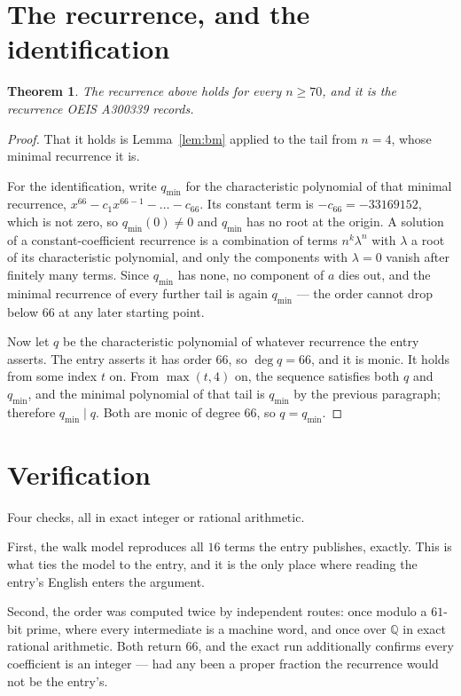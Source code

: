 \documentclass[11pt,a4paper]{article}
\theoremstyle{plain}
\newtheorem{theorem}{Theorem}
\theoremstyle{definition}
\begin{document}
\section{The recurrence, and the identification}

\begin{theorem}
The recurrence above holds for every $n\ge70$, and it is the recurrence OEIS A300339 records.
\end{theorem}

\begin{proof}
That it holds is Lemma~\ref{lem:bm} applied to the tail from $n=4$, whose minimal
recurrence it is.

For the identification, write $q_{\min}$ for the characteristic polynomial of that minimal
recurrence, $x^{66}-c_1x^{66-1}-\dots-c_{66}$. Its constant term is
$-c_{66}=-33169152$, which is not zero, so $q_{\min}(0)\neq0$ and $q_{\min}$ has no
root at the origin. A solution of a constant-coefficient recurrence is a combination of terms
$n^{k}\lambda^{n}$ with $\lambda$ a root of its characteristic polynomial, and only the
components with $\lambda=0$ vanish after finitely many terms. Since $q_{\min}$ has none, no
component of $a$ dies out, and the minimal recurrence of every further tail is again
$q_{\min}$ --- the order cannot drop below $66$ at any later starting point.

Now let $q$ be the characteristic polynomial of whatever recurrence the entry asserts. The
entry asserts it has order $66$, so $\deg q=66$, and it is monic. It holds from some
index $t$ on. From $\max(t,4)$ on, the sequence satisfies both $q$ and $q_{\min}$, and
the minimal polynomial of that tail is $q_{\min}$ by the previous paragraph; therefore
$q_{\min}\mid q$. Both are monic of degree $66$, so $q=q_{\min}$.
\end{proof}

\section{Verification}

Four checks, all in exact integer or rational arithmetic.

First, the walk model reproduces all $16$ terms the entry publishes, exactly. This is
what ties the model to the entry, and it is the only place where reading the entry's English
enters the argument.

Second, the order was computed twice by independent routes: once modulo a $61$-bit prime, where
every intermediate is a machine word, and once over $\mathbb{Q}$ in exact rational arithmetic.
Both return $66$, and the exact run additionally confirms every coefficient is an integer
--- had any been a proper fraction the recurrence would not be the entry's.
\end{document}
